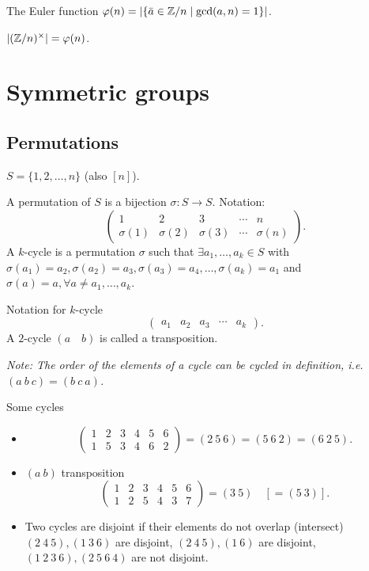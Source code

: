 \documentclass[10pt, a4paper]{article}
\begin{document}
The Euler function $\varphi(n) = \left|\{\bar{a} \in \mathbb{Z} / n \mid \gcd(a, n) = 1\}\right|$.

$|(\mathbb{Z} / n) ^ {\times}| = \varphi(n)$.

\newpage

\section{Symmetric groups}

\subsection{Permutations}
$S = \{1, 2, \dotsc, n\}$
(also $[n]$).

\begin{definition}
    A permutation of $S$ is a bijection $\sigma : S \to S$.
    Notation:
    \[
    \begin{pmatrix}
        1 & 2 & 3 & \dotsi & n \\
        \sigma(1) & \sigma(2) & \sigma(3) & \dotsi & \sigma(n)
    \end{pmatrix}.
    \]
    A $k$-cycle is a permutation $\sigma$ such that $\exists a_1, \dotsc, a_k \in S$ with $\sigma(a_1) = a_2, \sigma(a_2) = a_3, \sigma(a_3) = a_4, \dotsc, \sigma(a_k) = a_1$ and $\sigma(a) = a, \forall a \neq a_1, \dotsc, a_k$.

    Notation for $k$-cycle
    \[
    \begin{pmatrix}
        a_1 & a_2 & a_3 & \dotsi & a_k
    \end{pmatrix}.
    \]
    A $2$-cycle $(a\quad b)$ is called a transposition.
\end{definition}

\textit{Note:
The order of the elements of a cycle can be cycled in definition,
i.e. $(a\ b\ c) = (b\ c\ a)$.}

\begin{example}
    Some cycles
    \begin{itemize}
        \item 
        \[
        \begin{pmatrix}
            1 & 2 & 3 & 4 & 5 & 6 \\
            1 & 5 & 3 & 4 & 6 & 2
        \end{pmatrix} = (2\ 5\ 6) = (5\ 6\ 2) = (6\ 2\ 5).
        \]

        \item $(a\ b)$ transposition
        \[
        \begin{pmatrix}
            1 & 2 & 3 & 4 & 5 & 6 \\
            1 & 2 & 5 & 4 & 3 & 7
        \end{pmatrix} = (3\ 5)\quad [= (5\ 3)].
        \]

        \item Two cycles are disjoint if their elements do not overlap
        (intersect)
        $(2\ 4\ 5), (1\ 3\ 6)$ are disjoint,
        $(2\ 4\ 5), (1\ 6)$ are disjoint,
        $(1\ 2\ 3\ 6), (2\ 5\ 6\ 4)$ are not disjoint.
    \end{itemize}
\end{example}
\end{document}

